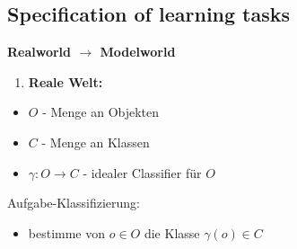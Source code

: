 \documentclass[11pt,a4paper]{article}
\begin{document}
\begin{flushleft}
\subsection{Specification of learning tasks}
    \textbf{Realworld $\rightarrow$ Modelworld} \newline
    \begin{enumerate}
    \item \textbf{Reale Welt:}
    \end{enumerate}
    \begin{itemize}
        \item $O$ - Menge an Objekten
        \item $C$ - Menge an Klassen
        \item $\gamma: O \rightarrow C$ - idealer Classifier für $O$
    \end{itemize}
    \quad Aufgabe-Klassifizierung:
    \begin{itemize}
        \item bestimme von $o \in O$ die Klasse $\gamma(o) \in C$
    \end{itemize}
    

\end{flushleft}
\end{document}
